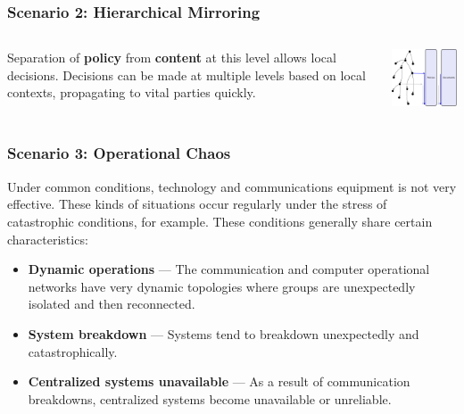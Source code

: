 \documentclass[t,handout, 10pt]{beamer}
\begin{document}
\begin{frame}
\frametitle{Scenario 2: Hierarchical Mirroring}
\begin{columns}[T]
\begin{column}{5cm}
Separation of \textbf{policy} from \textbf{content} at this level allows local decisions.
\newline
\newline
Decisions can be made at multiple levels based on local contexts, propagating to vital parties quickly.
\end{column}
\begin{column}{5cm}
\includegraphics[width=5cm]{hierarchy-3}
\end{column}
\end{columns}
\end{frame}

%
%

\begin{frame}
\frametitle{Scenario 3: Operational Chaos}
Under common conditions, technology and communications equipment is not very effective.  These kinds of situations occur regularly under the stress of catastrophic conditions, for example.
\newline
\newline
\pause
These conditions generally share certain characteristics:
\begin{itemize}
\item \textbf{Dynamic operations} --- The communication and computer operational networks have very dynamic topologies where groups are unexpectedly isolated and then reconnected.
\pause
\item \textbf{System breakdown} --- Systems tend to breakdown unexpectedly and catastrophically.
\pause
\item \textbf{Centralized systems unavailable} --- As a result of communication breakdowns, centralized systems become unavailable or unreliable.
\end{itemize}
\end{frame}
\end{document}
